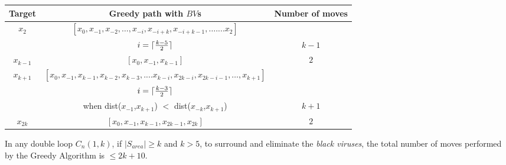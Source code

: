 \begin{center}
  \begin{tabular}{|c|c|c|}
 \hline
 Target & Greedy path with $BV$s & Number of moves \\
 
 \hline
$x_2$ &$[x_0, x_{-1}, x_{-2},\ldots, x_{-i},x_{-i+k}, x_{-i+k-1},\ldots.... x_2]$ & \\
&$i =  \lceil{{ k-5} \over 2}\rceil$  & $k-1$ \\ 
\hline
 $x_{k-1}$ & $[x_0, x_{-1}, x_{k-1}]$ & $2$ \\

 \hline
 $x_{k+1}$ &  $[x_0, x_{-1}, x_{k-1}, x_{k-2}, x_{k-3},.... x_{k-i}, x_{2k-i}, x_{2k-i-1}, \ldots, x_{k+1}]$ &\\
    &  $i = \lceil{{ k-3} \over 2}\rceil$  &\\  & when dist($x_{-1}$,$x_{k+1}$) $<$ dist($x_{-k}$,$x_{k+1}$) & $k+1$ \\
 
 \hline
 $x_{2k}$ & $[x_0, x_{-1}, x_{k-1}, x_{2k-1},x_{2k}]$ & $2$ \\ %

\hline
\end{tabular} 

 \end{center}
\begin{theorem}
In any double loop  $C_n(1,k)$,  if $\left\vert{S_{area}}\right\vert \geq  k$ and $k>5$, to surround and eliminate the {\it black viruses},
 the total number of moves performed by the Greedy Algorithm is $\leq 2k+10$.
\end{theorem}
